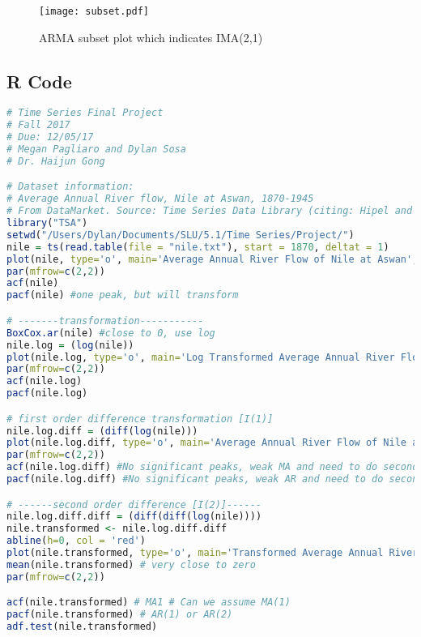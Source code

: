 \documentclass{article}
\begin{document}
\begin{figure}[H]
\begin{center}
\texttt{[image: subset.pdf]}
\caption{ARMA subset plot which indicates IMA(2,1)}
\end{center}
\end{figure}

\subsection{R Code}
\begin{lstlisting}[language=R]
# Time Series Final Project
# Fall 2017
# Due: 12/05/17
# Megan Pagliaro and Dylan Sosa
# Dr. Haijun Gong

# Dataset information: 
# Average Annual River flow, Nile at Aswan, 1870-1945
# From DataMarket. Source: Time Series Data Library (citing: Hipel and McLeod (1994))
library("TSA")
setwd("/Users/Dylan/Documents/SLU/5.1/Time Series/Project/")
nile = ts(read.table(file = "nile.txt"), start = 1870, deltat = 1)
plot(nile, type='o', main='Average Annual River Flow of Nile at Aswan', ylab='Average River Flow Discharge(m^3/s)', xlab='Year')
par(mfrow=c(2,2))
acf(nile)
pacf(nile) #one peak, but will transform 

# -------transformation-----------
BoxCox.ar(nile) #close to 0, use log 
nile.log = (log(nile))
plot(nile.log, type='o', main='Log Transformed Average Annual River Flow of Nile at Aswan', ylab='Average River Flow Discharge(m^3/s)', xlab='Year') #no significant change
par(mfrow=c(2,2))
acf(nile.log)
pacf(nile.log)

# first order difference transformation [I(1)]
nile.log.diff = (diff(log(nile)))
plot(nile.log.diff, type='o', main='Average Annual River Flow of Nile at Aswan', ylab='Average River Flow Discharge(m^3/s)', xlab='Year')
par(mfrow=c(2,2))
acf(nile.log.diff) #No significant peaks, weak MA and need to do second order difference
pacf(nile.log.diff) #No significant peaks, weak AR and need to do second order difference 

# ------second order difference [I(2)]------
nile.log.diff.diff = (diff(diff(log(nile))))
nile.transformed <- nile.log.diff.diff
abline(h=0, col = 'red')
plot(nile.transformed, type='o', main='Transformed Average Annual River Flow of Nile at Aswan', xlab='Year', ylab='(diff(diff(log(nile))))')
mean(nile.transformed) # very close to zero
par(mfrow=c(2,2))

acf(nile.transformed) # MA1 # Can we assume MA(1) 
pacf(nile.transformed) # AR(1) or AR(2) 
adf.test(nile.transformed)


\end{lstlisting}
\end{document}
